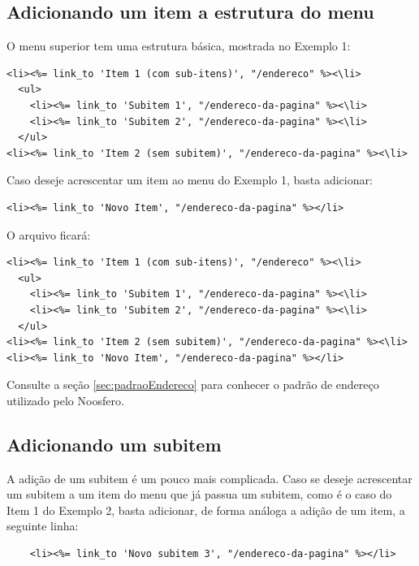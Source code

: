 \newpage
\subsection{Adicionando um item a estrutura do menu}

O menu superior tem uma estrutura básica, mostrada no Exemplo 1:

\begin{verbatim}
<li><%= link_to 'Item 1 (com sub-itens)', "/endereco" %><\li>
  <ul>
    <li><%= link_to 'Subitem 1', "/endereco-da-pagina" %><\li>
    <li><%= link_to 'Subitem 2', "/endereco-da-pagina" %><\li>
  </ul>
<li><%= link_to 'Item 2 (sem subitem)', "/endereco-da-pagina" %><\li>
\end{verbatim}

Caso deseje acrescentar um item ao menu do Exemplo 1, basta adicionar:

\begin{verbatim}
<li><%= link_to 'Novo Item', "/endereco-da-pagina" %></li>
\end{verbatim}

O arquivo ficará:

\begin{verbatim}
<li><%= link_to 'Item 1 (com sub-itens)', "/endereco" %><\li>
  <ul>
    <li><%= link_to 'Subitem 1', "/endereco-da-pagina" %><\li>
    <li><%= link_to 'Subitem 2', "/endereco-da-pagina" %><\li>
  </ul>
<li><%= link_to 'Item 2 (sem subitem)', "/endereco-da-pagina" %><\li>
<li><%= link_to 'Novo Item', "/endereco-da-pagina" %></li>
\end{verbatim}

Consulte a seção \ref{sec:padraoEndereco} para conhecer o padrão de endereço utilizado pelo Noosfero.

\subsection{Adicionando um subitem}

A adição de um subitem é um pouco mais complicada. Caso se deseje acrescentar um subitem a um item do menu que já passua um subitem, como é o caso do Item 1 do Exemplo 2, basta adicionar, de forma análoga a adição de um item, a seguinte linha:

\begin{verbatim}
    <li><%= link_to 'Novo subitem 3', "/endereco-da-pagina" %></li>
\end{verbatim}

